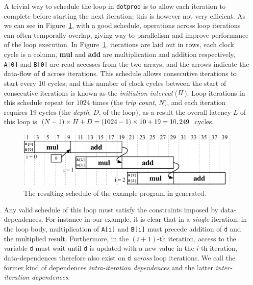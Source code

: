 A trivial way to schedule the loop in \verb|dotprod| is to allow each iteration
to complete before starting the next iteration; this is however not very
efficient.  As we can see in Figure~\ref{bg:fig:schedule}, with a good
schedule, operations across loop iterations can often temporally overlap,
giving way to parallelism and improve performance of the loop execution.  In
Figure~\ref{bg:fig:schedule}, iterations are laid out in rows, each clock cycle
is a column, \textbf{mul} and \textbf{add} are multiplication and addition
respectively, \verb|A[0]| and \verb|B[0]| are read accesses from the two
arrays, and the arrows indicate the data-flow of \verb|d| across iterations.
This schedule allows consecutive iterations to start every 10 cycles; and this
number of clock cycles between the start of consecutive iterations is known
as the \emph{initiation interval} ($\mathit{II}$).  Loop iterations in this schedule
repeat for $1024$ times (the \emph{trip count}, $N$), and each iteration
requires $19$ cycles (the \emph{depth}, $D$, of the loop), as a result the
overall latency $L$ of this loop is $(N - 1) \times \mathit{II} + D = (1024 - 1) \times
10 + 19 = 10,249$ cycles.
\begin{figure}[ht]
    \centering
    \includegraphics[width=0.8\linewidth]{bg/fig/schedule}
    \caption{%
        The resulting schedule of the example program in generated.
    }\label{bg:fig:schedule}
\end{figure}

Any valid schedule of this loop must satisfy the constraints imposed by
data-dependences.  For instance in our example, it is clear that in a
\emph{single} iteration, in the loop body, multiplication of \verb|A[i]|
and \verb|B[i]| must precede addition of \verb|d| and the multiplied
result.  Furthermore, in the $(i + 1)$-th iteration, access to the variable
\verb|d| must wait until \verb|d| is updated with a new value in the $i$-th
iteration, data-dependences therefore also exist on \verb|d| \emph{across}
loop iterations.  We call the former kind of dependences \emph{intra-iteration
dependences} and the latter \emph{inter-iteration dependences}.

